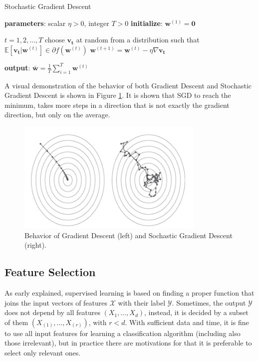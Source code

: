 \begin{algorithm}
	\caption{Stochastic Gradient Descent}\label{alg:SGD}
	\begin{algorithmic}[1]
		\State \textbf{parameters}: scalar $\eta > 0$, integer $T>0$
		\State \textbf{initialize}: $\mathbf{w}^{(1)} = \mathbf{0}$
		
		\For $t = 1, 2, \dots , T$
		\State choose $\mathbf{v_t}$ at random from a distribution such that $\mathbb{E}[\mathbf{v_t} | \mathbf{w}^{(t)}] \in \partial f(\mathbf{w}^{(t)})$
		\State $\mathbf{w}^{(t+1)} = \mathbf{w}^{(t)} - \eta \nabla \mathbf{v_t}$
		\EndFor
		
		\State \textbf{output}: $\mathbf{\bar{w}} = \frac{1}{T} \sum_{i=1}^{T} \mathbf{w}^{(t)}$
	\end{algorithmic}
\end{algorithm}

A visual demonstration of the behavior of both Gradient Descent and Stochastic Gradient Descent is shown in Figure \ref{fig:gd-sgd}. It is shown that SGD to reach the minimum, takes more steps in a direction that is not exactly the gradient direction, but only on the average.


\begin{figure}[ht]
	\centering
	\includegraphics[width=0.8\textwidth]{figures/gd-sgd.png}
	\caption{Behavior of Gradient Descent (left) and Sochastic Gradient Descent (right).}
	\label{fig:gd-sgd}
\end{figure}


\subsection{Feature Selection}

As early explained, supervised learning is based on finding a proper function that joins the input vectors of features $\mathcal{X}$ with their label $\mathcal{Y}$. Sometimes, the output $\mathcal{Y}$ does not depend by all features $(X_1, \dots, X_d)$, instead, it is decided by a subset of them $(X_{(1)}, \dots, X_{(r)})$, with $r<d$. With sufficient data and time, it is fine to use all input features for learning a classification algorithm (including also those irrelevant), but in practice there are motivations for that it is preferable to select only relevant ones.\\

